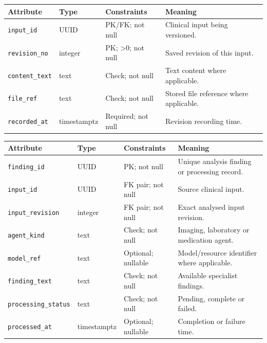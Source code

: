 \begin{reporttable}
\setlength{\tabcolsep}{5pt}
\centering
\small
\caption{InputRevision attributes, types and constraints.}
\label{tab:kashaf:dict-inputrevision}
\begin{tabular}{|p{}|p{}|p{}|p{}|}
\hline
Attribute & Type & Constraints & Meaning \\ \hline
\texttt{input\_id} & UUID & PK/FK; not null & Clinical input being versioned. \\ \hline
\texttt{revision\_no} & integer & PK; >0; not null & Saved revision of this input. \\ \hline
\texttt{content\_text} & text & Check; not null & Text content where applicable. \\ \hline
\texttt{file\_ref} & text & Check; not null & Stored file reference where applicable. \\ \hline
\texttt{recorded\_at} & timestamptz & Required; not null & Revision recording time. \\ \hline
\end{tabular}
\end{reporttable}

\begin{reporttable}
\setlength{\tabcolsep}{5pt}
\centering
\small
\caption{SpecialistFinding attributes, types and constraints.}
\label{tab:kashaf:dict-specialistfinding}
\begin{tabular}{|p{}|p{}|p{}|p{}|}
\hline
Attribute & Type & Constraints & Meaning \\ \hline
\texttt{finding\_id} & UUID & PK; not null & Unique analysis finding or processing record. \\ \hline
\texttt{input\_id} & UUID & FK pair; not null & Source clinical input. \\ \hline
\texttt{input\_revision} & integer & FK pair; not null & Exact analysed input revision. \\ \hline
\texttt{agent\_kind} & text & Check; not null & Imaging, laboratory or medication agent. \\ \hline
\texttt{model\_ref} & text & Optional; nullable & Model/resource identifier where applicable. \\ \hline
\texttt{finding\_text} & text & Check; not null & Available specialist findings. \\ \hline
\texttt{processing\_status} & text & Check; not null & Pending, complete or failed. \\ \hline
\texttt{processed\_at} & timestamptz & Optional; nullable & Completion or failure time. \\ \hline
\end{tabular}
\end{reporttable}

